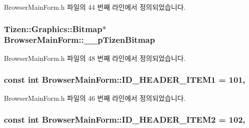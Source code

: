 Browser\+Main\+Form.\+h 파일의 44 번째 라인에서 정의되었습니다.

\hypertarget{class_browser_main_form_a9ebb215a8612469b49cd95dee767e9cc}{
\subsubsection[{\+\_\+\+\_\+p\+Tizen\+Bitmap}]{\setlength{\rightskip}{0pt plus 5cm}Tizen\+::\+Graphics\+::\+Bitmap$\ast$ Browser\+Main\+Form\+::\+\_\+\+\_\+p\+Tizen\+Bitmap\hspace{0.3cm}{\ttfamily [protected]}}}\label{class_browser_main_form_a9ebb215a8612469b49cd95dee767e9cc}


Browser\+Main\+Form.\+h 파일의 48 번째 라인에서 정의되었습니다.

\hypertarget{class_browser_main_form_a53791859561cacbbdb6f3089f64fb9fc}{
\subsubsection[{I\+D\+\_\+\+H\+E\+A\+D\+E\+R\+\_\+\+I\+T\+E\+M1}]{\setlength{\rightskip}{0pt plus 5cm}const int Browser\+Main\+Form\+::\+I\+D\+\_\+\+H\+E\+A\+D\+E\+R\+\_\+\+I\+T\+E\+M1 = 101\hspace{0.3cm}{\ttfamily [static]}, {\ttfamily [protected]}}}\label{class_browser_main_form_a53791859561cacbbdb6f3089f64fb9fc}


Browser\+Main\+Form.\+h 파일의 46 번째 라인에서 정의되었습니다.

\hypertarget{class_browser_main_form_ab0a39b9df377880f65a4753679f43864}{
\subsubsection[{I\+D\+\_\+\+H\+E\+A\+D\+E\+R\+\_\+\+I\+T\+E\+M2}]{\setlength{\rightskip}{0pt plus 5cm}const int Browser\+Main\+Form\+::\+I\+D\+\_\+\+H\+E\+A\+D\+E\+R\+\_\+\+I\+T\+E\+M2 = 102\hspace{0.3cm}{\ttfamily [static]}, {\ttfamily [protected]}}}\label{class_browser_main_form_ab0a39b9df377880f65a4753679f43864}


